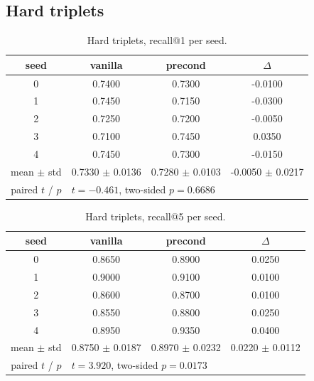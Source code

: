 \subsection{Hard triplets}
\begin{table}[H]
\centering
\caption{Hard triplets, recall@1 per seed.}
\label{tab:recall-hard-K1}
\begin{tabular}{c c c c}
\toprule
seed & vanilla & precond & $\Delta$ \\
\midrule
0 & 0.7400 & 0.7300 & -0.0100 \\
1 & 0.7450 & 0.7150 & -0.0300 \\
2 & 0.7250 & 0.7200 & -0.0050 \\
3 & 0.7100 & 0.7450 & 0.0350 \\
4 & 0.7450 & 0.7300 & -0.0150 \\
\midrule
mean $\pm$ std & 0.7330 $\pm$ 0.0136 & 0.7280 $\pm$ 0.0103 & -0.0050 $\pm$ 0.0217 \\
paired $t$ / $p$ & \multicolumn{3}{l}{$t = -0.461$, two-sided $p = 0.6686$} \\
\bottomrule
\end{tabular}
\end{table}

\begin{table}[H]
\centering
\caption{Hard triplets, recall@5 per seed.}
\label{tab:recall-hard-K5}
\begin{tabular}{c c c c}
\toprule
seed & vanilla & precond & $\Delta$ \\
\midrule
0 & 0.8650 & 0.8900 & 0.0250 \\
1 & 0.9000 & 0.9100 & 0.0100 \\
2 & 0.8600 & 0.8700 & 0.0100 \\
3 & 0.8550 & 0.8800 & 0.0250 \\
4 & 0.8950 & 0.9350 & 0.0400 \\
\midrule
mean $\pm$ std & 0.8750 $\pm$ 0.0187 & 0.8970 $\pm$ 0.0232 & 0.0220 $\pm$ 0.0112 \\
paired $t$ / $p$ & \multicolumn{3}{l}{$t = 3.920$, two-sided $p = 0.0173$} \\
\bottomrule
\end{tabular}
\end{table}


